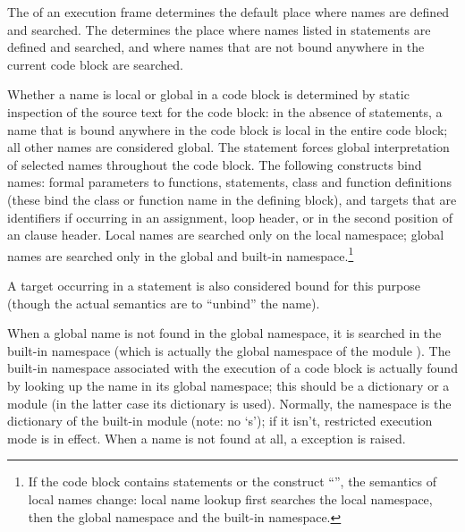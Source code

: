 The  of an execution
frame determines the default place where names are defined and
searched.  The
 determines the place
where names listed in  statements are
defined and searched, and where names that are not bound anywhere in
the current code block are searched.

Whether a name is local or global in a code block is determined by
static inspection of the source text for the code block: in the
absence of  statements, a name that is bound anywhere
in the code block is local in the entire code block; all other names
are considered global.  The  statement forces global
interpretation of selected names throughout the code block.  The
following constructs bind names: formal parameters to functions,
 statements, class and function definitions (these
bind the class or function name in the defining block), and targets
that are identifiers if occurring in an assignment,  loop
header, or in the second position of an  clause
header.  Local names are searched only on the local namespace; global
names are searched only in the global and built-in
namespace.\footnote{
  If the code block contains  statements or the
  construct ``'', the semantics of local
  names change: local name lookup first searches the local namespace,
  then the global namespace and the built-in namespace.}

A target occurring in a  statement is also considered bound
for this purpose (though the actual semantics are to ``unbind'' the
name).

When a global name is not found in the global namespace, it is
searched in the built-in namespace (which is actually the global
namespace of the module
).  The built-in
namespace associated with the execution of a code block is actually
found by looking up the name  in its global
namespace; this should be a dictionary or a module (in the latter case
its dictionary is used).  Normally, the  namespace
is the dictionary of the built-in module  (note:
no `s'); if it isn't, restricted
execution mode is in effect.  When a 
name is not found at all, a
 exception is raised.

